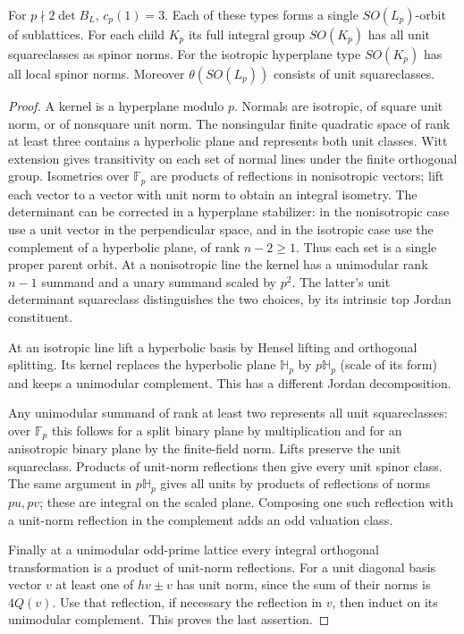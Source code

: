 \begin{lemma}\label{lem:indlocal}
For $p\nmid 2\det B_L$, $c_p(1)=3$. Each of these types forms a single $SO(L_p)$-orbit of sublattices. For each child $K_p$ its full integral group $SO(K_p)$ has all unit squareclasses as spinor norms. For the isotropic hyperplane type $SO(K_p)$ has all local spinor norms. Moreover $\theta(SO(L_p))$ consists of unit squareclasses.
\end{lemma}
\begin{proof}
A kernel is a hyperplane modulo $p$. Normals are isotropic, of square unit norm, or of nonsquare unit norm. The nonsingular finite quadratic space of rank at least three contains a hyperbolic plane and represents both unit classes. Witt extension gives transitivity on each set of normal lines under the finite orthogonal group. Isometries over $\mathbb F_p$ are products of reflections in nonisotropic vectors; lift each vector to a vector with unit norm to obtain an integral isometry. The determinant can be corrected in a hyperplane stabilizer: in the nonisotropic case use a unit vector in the perpendicular space, and in the isotropic case use the complement of a hyperbolic plane, of rank $n-2\ge1$. Thus each set is a single proper parent orbit.
At a nonisotropic line the kernel has a unimodular rank $n-1$ summand and a unary summand scaled by $p^2$. The latter's unit determinant squareclass distinguishes the two choices, by its intrinsic top Jordan constituent. 

At an isotropic line lift a hyperbolic basis by Hensel lifting and orthogonal splitting. Its kernel replaces the hyperbolic plane $\mathbb H_p$ by $p\mathbb H_p$ (scale of its form) and keeps a unimodular complement. This has a different Jordan decomposition. 

Any unimodular summand of rank at least two represents all unit squareclasses: over $\mathbb F_p$ this follows for a split binary plane by multiplication and for an anisotropic binary plane by the finite-field norm. Lifts preserve the unit squareclass. Products of unit-norm reflections then give every unit spinor class. The same argument in $p\mathbb H_p$ gives all units by products of reflections of norms $pu,pv$; these are integral on the scaled plane. Composing one such reflection with a unit-norm reflection in the complement adds an odd valuation class. 

Finally at a unimodular odd-prime lattice every integral orthogonal transformation is a product of unit-norm reflections. For a unit diagonal basis vector $v$ at least one of $hv\pm v$ has unit norm, since the sum of their norms is $4Q(v)$. Use that reflection, if necessary the reflection in $v$, then induct on its unimodular complement. This proves the last assertion.
\end{proof}
